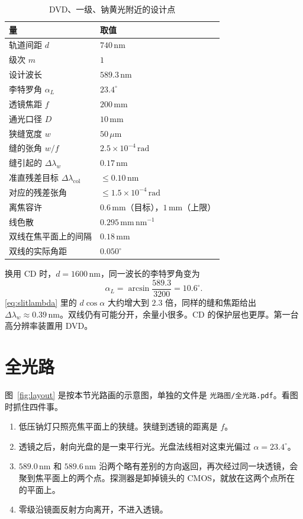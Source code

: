 \documentclass[a4paper,11pt]{ctexart}
\begin{document}
\begin{table}[htbp]
\centering
\caption{DVD、一级、钠黄光附近的设计点}
\label{tab:design}
\begin{tabular}{ll}
\toprule
量 & 取值 \\
\midrule
轨道间距 \(d\) & \(740\,\mathrm{nm}\) \\
级次 \(m\) & \(1\) \\
设计波长 & \(589.3\,\mathrm{nm}\) \\
李特罗角 \(\alpha_L\) & \(23.4^\circ\) \\
透镜焦距 \(f\) & \(200\,\mathrm{mm}\) \\
通光口径 \(D\) & \(10\,\mathrm{mm}\) \\
狭缝宽度 \(w\) & \(50\,\mu\mathrm{m}\) \\
缝的张角 \(w/f\) & \(2.5\times 10^{-4}\,\mathrm{rad}\) \\
缝引起的 \(\Delta\lambda_w\) & \(0.17\,\mathrm{nm}\) \\
准直残差目标 \(\Delta\lambda_{\mathrm{col}}\) & \(\le 0.10\,\mathrm{nm}\) \\
对应的残差张角 & \(\le 1.5\times 10^{-4}\,\mathrm{rad}\) \\
离焦容许 & \(0.6\,\mathrm{mm}\)（目标），\(1\,\mathrm{mm}\)（上限） \\
线色散 & \(0.295\,\mathrm{mm\,nm^{-1}}\) \\
双线在焦平面上的间隔 & \(0.18\,\mathrm{mm}\) \\
双线的实际角距 & \(0.050^\circ\) \\
\bottomrule
\end{tabular}
\end{table}

换用 CD 时，\(d=1600\,\mathrm{nm}\)，同一波长的李特罗角变为
\[
\alpha_L = \arcsin\frac{589.3}{3200} = 10.6^\circ.
\]
\eqref{eq:slitlambda} 里的 \(d\cos\alpha\) 大约增大到 \(2.3\) 倍，同样的缝和焦距给出 \(\Delta\lambda_w\approx 0.39\,\mathrm{nm}\)。双线仍有可能分开，余量小很多。CD 的保护层也更厚。第一台高分辨率装置用 DVD。

\section{全光路}
\label{sec:layout}

图~\ref{fig:layout} 是按本节光路画的示意图，单独的文件是 \texttt{光路图/全光路.pdf}。看图时抓住四件事。

\begin{enumerate}
\item 低压钠灯只照亮焦平面上的狭缝。狭缝到透镜的距离是 \(f\)。
\item 透镜之后，射向光盘的是一束平行光。光盘法线相对这束光偏过 \(\alpha=23.4^\circ\)。
\item \(589.0\,\mathrm{nm}\) 和 \(589.6\,\mathrm{nm}\) 沿两个略有差别的方向返回，再次经过同一块透镜，会聚到焦平面上的两个点。探测器是卸掉镜头的 CMOS，就放在这两个点所在的平面上。
\item 零级沿镜面反射方向离开，不进入透镜。
\end{enumerate}
\end{document}
